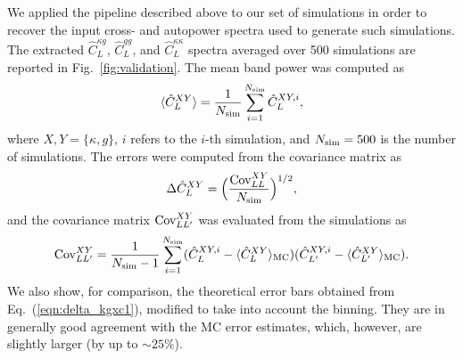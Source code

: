 We applied the pipeline described above to our set of simulations in order to recover the input cross- and autopower spectra used to generate such simulations. The extracted $\hat{C}^{\kappa g}_{L}$, $\hat{C}^{gg}_{L}$, and $\hat{C}^{\kappa\kappa}_{L}$  spectra averaged over 500 simulations are reported in Fig.~\eqref{fig:validation}.  The mean band power was computed as
\begin{equation}
\langle \hat{C}^{XY}_{L} \rangle = \frac{1}{N_{\text{sim}}}\sum_{i=1}^{N_{\text{sim}}} \hat{C}^{XY,i}_{L},
\end{equation}
where $X,Y = \{\kappa,g\}$, $i$ refers to the $i$-th simulation, and $N_{\text{sim}}=500$ is the number of simulations. The errors were computed from the covariance matrix as
%
\begin{equation}
\Delta \hat{C}^{XY}_{L} = \Bigl(\frac{\text{Cov}^{XY}_{LL}}{N_{\text{sim}}} \Bigr)^{1/2},
\end{equation}
%
and the covariance matrix $\text{Cov}^{XY}_{LL'}$ was evaluated from the simulations as
%
\begin{equation}
\text{Cov}^{XY}_{LL'} = \frac{1}{N_{\text{sim}}-1} \sum_{i=1}^{N_{\text{sim}}} ( \hat{C}^{XY,i}_{L} - \langle \hat{C}^{XY}_{L}\rangle_{\mathrm{MC}})( \hat{C}^{XY,i}_{L'} - \langle \hat{C}^{XY}_{L'}\rangle_{\mathrm{MC}}).
\end{equation}
%
We also show, for comparison, the theoretical error bars obtained from Eq.~(\eqref{eqn:delta_kgxc1}), modified to take into account the binning. They are in generally good agreement with the \gls{MC} error estimates, which, however, are slightly larger (by up to $\sim 25 \%$).

